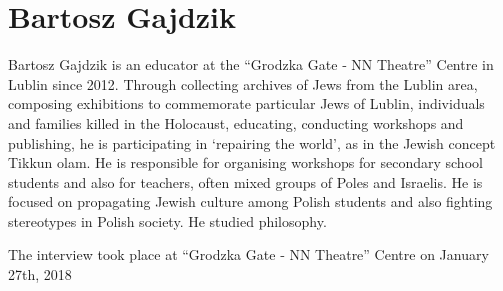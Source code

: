 \section{Bartosz Gajdzik}

Bartosz Gajdzik is an educator at the “Grodzka Gate ‐ NN Theatre” Centre in Lublin since 2012. Through collecting archives of Jews from the Lublin area, composing exhibitions to commemorate particular Jews of Lublin, individuals and families killed in the Holocaust, educating, conducting workshops and publishing, he is participating in ‘repairing the world’, as in the Jewish concept Tikkun olam. He is responsible for organising workshops for secondary school students and also for teachers, often mixed groups of Poles and Israelis. He is focused on propagating Jewish culture among Polish students and also fighting stereotypes in Polish society. He studied philosophy. 

The interview took place at “Grodzka Gate ‐ NN Theatre” Centre on January 27th, 2018 

